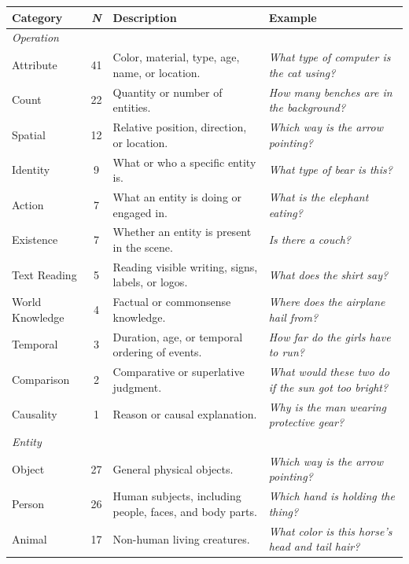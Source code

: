 \documentclass[letterpaper]{article} %
\begin{document}
\begin{table}[b]
\centering
{\fontsize{9}{10}\selectfont
\renewcommand{\arraystretch}{0.95}
\setlength{\tabcolsep}{4pt}
\begin{tabularx}{\textwidth}{@{}p{}cXp{}@{}}
\toprule
\textbf{Category} & \textbf{\textit{N}} & \textbf{Description} & \textbf{Example} \\
\midrule
\multicolumn{4}{l}{\textit{Operation}} \\
\midrule
Attribute       & 41 & Color, material, type, age, name, or location. & \textit{What type of computer is the cat using?} \\
Count           & 22 & Quantity or number of entities. & \textit{How many benches are in the background?} \\
Spatial         & 12 & Relative position, direction, or location. & \textit{Which way is the arrow pointing?} \\
Identity        & 9  & What or who a specific entity is. & \textit{What type of bear is this?} \\
Action          & 7  & What an entity is doing or engaged in. & \textit{What is the elephant eating?} \\
Existence       & 7  & Whether an entity is present in the scene. & \textit{Is there a couch?} \\
Text Reading    & 5  & Reading visible writing, signs, labels, or logos. & \textit{What does the shirt say?} \\
World Knowledge & 4  & Factual or commonsense knowledge. & \textit{Where does the airplane hail from?} \\
Temporal        & 3  & Duration, age, or temporal ordering of events. & \textit{How far do the girls have to run?} \\
Comparison      & 2  & Comparative or superlative judgment. & \textit{What would these two do if the sun got too bright?} \\
Causality       & 1  & Reason or causal explanation. & \textit{Why is the man wearing protective gear?} \\
\midrule
\multicolumn{4}{l}{\textit{Entity}} \\
\midrule
Object      & 27 & General physical objects. & \textit{Which way is the arrow pointing?} \\
Person      & 26 & Human subjects, including people, faces, and body parts. & \textit{Which hand is holding the thing?} \\
Animal      & 17 & Non-human living creatures. & \textit{What color is this horse's head and tail hair?} \\

\end{tabularx}}
\end{table}
\end{document}
